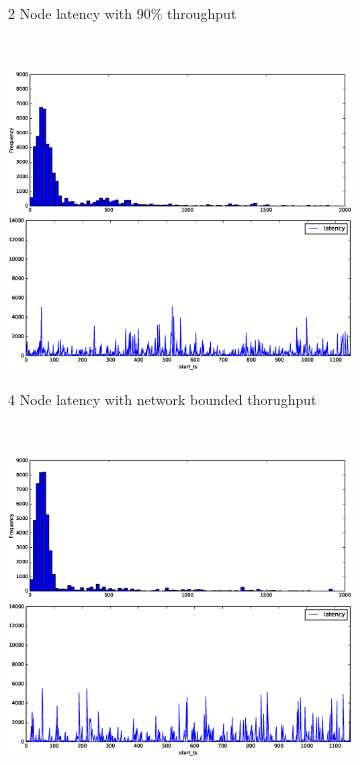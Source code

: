 \begin{figure}
\begin{subfigure}[b]{0.23\textwidth}
        \caption{2 Node latency with 90\% throughput }
    \end{subfigure}
    ~ 
    \begin{subfigure}[b]{0.23\textwidth}
        \includegraphics[width=\textwidth]{eps/flink_agg_4node_th_max_hist}
         \includegraphics[width=\textwidth]{eps/flink_agg_4node_th_max_ts}

        \caption{4 Node latency with network bounded thorughput }
    \end{subfigure}
   ~
    \begin{subfigure}[b]{0.23\textwidth}
        \includegraphics[width=\textwidth]{eps/flink_agg_8node_th_max_hist}
         \includegraphics[width=\textwidth]{eps/flink_agg_8node_th_max_ts}


\end{subfigure}
\end{figure}

